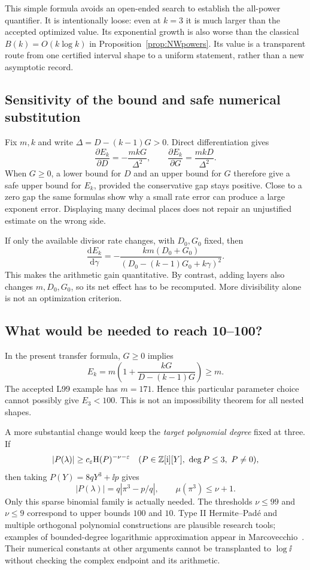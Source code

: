 This simple formula avoids an open-ended search to establish the
all-power quantifier. It is intentionally loose: even at \(k=3\)
it is much larger than the accepted optimized value. Its exponential
growth is also worse than the classical \(B(k)=O(k\log k)\) in
Proposition~\ref{prop:NWpowers}. Its value is a transparent route
from one certified interval shape to a uniform statement, rather
than a new asymptotic record.

\subsection{Sensitivity of the bound and safe numerical substitution}

Fix \(m,k\) and write \(\Delta=D-(k-1)G>0\). Direct
differentiation gives
\[
\frac{\partial E_k}{\partial D}=-\frac{mkG}{\Delta^2},\qquad
\frac{\partial E_k}{\partial G}=\frac{mkD}{\Delta^2}.
\]
When \(G\ge0\), a lower bound for \(D\) and an upper bound for
\(G\) therefore give a safe upper bound for \(E_k\), provided the
conservative gap stays positive. Close to a zero gap the same
formulas show why a small rate error can produce a large exponent
error. Displaying many decimal places does not repair an
unjustified estimate on the wrong side.

If only the available divisor rate changes, with \(D_0,G_0\)
fixed, then
\[
\frac{\mathrm dE_k}{\mathrm d\gamma}
=-\frac{km(D_0+G_0)}{(D_0-(k-1)G_0+k\gamma)^2}.
\]
This makes the arithmetic gain quantitative. By contrast, adding
layers also changes \(m,D_0,G_0\), so its net effect has to be
recomputed. More divisibility alone is not an optimization criterion.

\subsection{What would be needed to reach 10--100?}

In the present transfer formula, \(G\ge0\) implies
\[
E_k=m\left(1+\frac{kG}{D-(k-1)G}\right)\ge m.
\]
The accepted L99 example has \(m=171\). Hence this particular
parameter choice cannot possibly give \(E_3<100\).
This is not an impossibility theorem for all nested shapes.

A more substantial change would keep the \emph{target polynomial
degree} fixed at three. If
\[
|P(\lambda)|\ge c_\varepsilon\mathrm H(P)^{-\nu-\varepsilon}
\quad(P\in\mathbb Z[\mathrm{i}][Y],\ \deg P\le3,\ P\ne0),
\]
then taking \(P(Y)=8qY^3+\ii p\) gives
\[
|P(\lambda)|=q|\pi^3-p/q|,\qquad \mu(\pi^3)\le\nu+1.
\]
Only this sparse binomial family is actually needed.
The thresholds \(\nu\le99\) and \(\nu\le9\) correspond to upper
bounds \(100\) and \(10\).
Type II Hermite--Pad\'e and multiple orthogonal polynomial
constructions are plausible research tools; examples of
bounded-degree logarithmic approximation appear in
Marcovecchio~\cite{Marcovecchio}. Their numerical constants at other
arguments cannot be transplanted to \(\log\ii\) without checking
the complex endpoint and its arithmetic.
